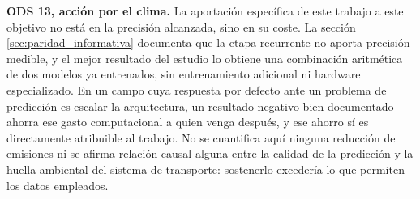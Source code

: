 \textbf{ODS 13, acción por el clima.} La aportación específica de este trabajo a este
objetivo no está en la precisión alcanzada, sino en su coste. La sección
\ref{sec:paridad_informativa} documenta que la etapa recurrente no aporta precisión
medible, y el mejor resultado del estudio lo obtiene una combinación aritmética de dos
modelos ya entrenados, sin entrenamiento adicional ni hardware especializado. En un campo
cuya respuesta por defecto ante un problema de predicción es escalar la arquitectura, un
resultado negativo bien documentado ahorra ese gasto computacional a quien venga después,
y ese ahorro sí es directamente atribuible al trabajo. No se cuantifica aquí ninguna reducción de emisiones ni se afirma relación
causal alguna entre la calidad de la predicción y la huella ambiental del sistema de
transporte: sostenerlo excedería lo que permiten los datos empleados.

\label{CuerpoLastPage}
